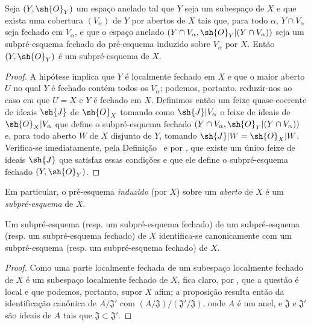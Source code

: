 \documentclass[oneside]{amsart}
\newcommand{\oldpage}[2][]{{\marginnote{\normalfont\textbf{#1}~|~#2}}\ignorespaces}
\let\EGAOriginalLabel\label
\renewcommand{\label}[1]{\phantomsection\EGAOriginalLabel{#1}}
\begin{document}
\begin{proposition}[4.1.5]
\label{I.4.1.5}
Seja $(Y,\sh{O}_Y)$ um espaço anelado tal que $Y$ seja um subespaço de $X$ e que exista uma cobertura $(V_\alpha)$ de $Y$ por abertos de $X$ tais que, para todo $\alpha$, $Y\cap V_\alpha$ seja fechado em $V_\alpha$, e que o espaço anelado $(Y\cap V_\alpha,\sh{O}_Y|(Y\cap V_\alpha))$ seja um subpré-esquema fechado do pré-esquema induzido sobre $V_\alpha$ por $X$.
Então $(Y,\sh{O}_Y)$ é um subpré-esquema de $X$.
\end{proposition}

\begin{proof}
A hipótese implica que $Y$ é localmente fechado em $X$ e que o maior aberto $U$ no qual $Y$ é fechado contém todos os $V_\alpha$;
podemos, portanto, reduzir-nos ao caso em que $U=X$ e $Y$ é fechado em $X$.
Definimos então um feixe quase-coerente de ideais $\sh{J}$ de $\sh{O}_X$ tomando como $\sh{J}|V_\alpha$ o feixe de ideais de $\sh{O}_X|V_\alpha$ que define o subpré-esquema fechado $(Y\cap V_\alpha,\sh{O}_Y|(Y\cap V_\alpha))$ e, para todo aberto $W$ de $X$ disjunto de $Y$, tomando $\sh{J}|W=\sh{O}_X|W$.
Verifica-se imediatamente, pela Definição~ e por , que existe um único feixe de ideais $\sh{J}$ que satisfaz essas condições e que ele define o subpré-esquema fechado $(Y,\sh{O}_Y)$.
\end{proof}

Em particular, o pré-esquema \emph{induzido} (por $X$) sobre um \emph{aberto} de $X$ é um \emph{subpré-esquema} de $X$.

\begin{proposition}[4.1.6]
\label{I.4.1.6}
Um subpré-esquema (resp. um subpré-esquema fechado) de um subpré-esquema
\oldpage[I]{121}
(resp. um subpré-esquema fechado) de $X$ identifica-se canonicamente com um subpré-esquema (resp. um subpré-esquema fechado) de $X$.
\end{proposition}

\begin{proof}
Como uma parte localmente fechada de um subespaço localmente fechado de $X$ é um subespaço localmente fechado de $X$, fica claro, por , que a questão é local e que podemos, portanto, supor $X$ afim;
a proposição resulta então da identificação canônica de $A/\mathfrak{J}'$ com $(A/\mathfrak{J})/(\mathfrak{J}'/\mathfrak{J})$, onde $A$ é um anel, e $\mathfrak{J}$ e $\mathfrak{J}'$ são ideais de $A$ tais que $\mathfrak{J}\subset\mathfrak{J}'$.
\end{proof}
\end{document}
